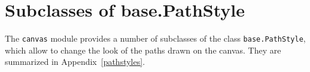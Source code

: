 \section{Subclasses of base.PathStyle}

The \verb|canvas| module provides a number of subclasses of the class
\verb|base.PathStyle|, which allow to change the look of the paths
drawn on the canvas. They are summarized in Appendix~\ref{pathstyles}.





